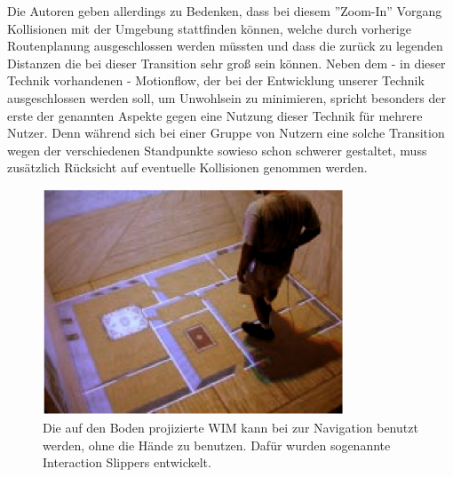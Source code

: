 Die Autoren geben allerdings zu Bedenken, dass bei diesem ”Zoom-In” Vorgang Kollisionen mit der Umgebung stattfinden können, welche durch vorherige Routenplanung ausgeschlossen werden müssten und dass die zurück zu legenden Distanzen die bei dieser Transition sehr groß sein können. 
Neben dem - in dieser Technik vorhandenen - Motionflow, der bei der Entwicklung unserer Technik ausgeschlossen werden soll, um Unwohlsein zu minimieren, spricht besonders der erste der genannten Aspekte gegen eine Nutzung dieser Technik für mehrere Nutzer. Denn während sich bei einer Gruppe von Nutzern eine solche Transition wegen der verschiedenen Standpunkte sowieso schon schwerer gestaltet, muss zusätzlich Rücksicht auf eventuelle Kollisionen genommen werden.

\begin{figure}[h]
  \centering
  \includegraphics[width=0.8\textwidth]{images/step_wim.png}
  \caption{Die auf den Boden projizierte WIM kann bei \cite{LaViola2004Hands-freeEnvironments} zur Navigation benutzt werden, ohne die Hände zu benutzen. Dafür wurden sogenannte \glqq Interaction Slippers\grqq{} entwickelt.}
  \label{fig:todo}
\end{figure}

